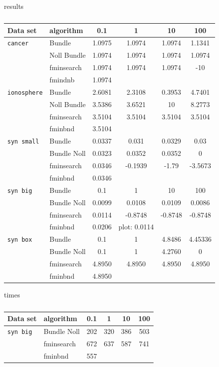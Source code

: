 results

\begin{center}
\begin{table}[H]%
	\begin{tabular}{llcccc}
		\hline
    Data set & algorithm & 0.1 & 1 & 10 & 100 \\
		\hline
		\texttt{cancer} & Bundle & 1.0975 & 1.0974 & 1.0974 & 1.1341 \\
		 & Noll Bundle & 1.0974 & 1.0974 & 1.0974 & 1.0974 \\
		 &  fminsearch & 1.0974 & 1.0974 & 1.0974 & -10 \\
		 & fmindnb & 1.0974 \\
		\texttt{ionosphere} & Bundle & 2.6081 & 2.3108 & 0.3953 & 4.7401 \\
		 & Noll Bundle & 3.5386 & 3.6521 & 10 & 8.2773 \\
		 & fminsearch & 3.5104 & 3.5104 & 3.5104 & 3.5104 \\
		 & fminbnd & 3.5104 \\
		\texttt{syn small} & Bundle & 0.0337 & 0.031 & 0.0329& 0.03 \\
		 & Bundle Noll & 0.0323 & 0.0352 & 0.0352 & 0 \\
		 & fminsearch & 0.0346 & -0.1939 & -1.79 & -3.5673 \\
		 & fminbnd & 0.0346 \\
		\texttt{syn big} & Bundle & 0.1 & 1 & 10 & 100 \\
		 & Bundle Noll & 0.0099 & 0.0108 & 0.0109 & 0.0086 \\
		 & fminsearch & 0.0114 & -0.8748 & -0.8748 & -0.8748 \\
		 & fminbnd & 0.0206 & plot: 0.0114\\
		\texttt{syn box} & Bundle & 0.1 & 1 & 4.8486 & 4.45336 \\
		 & Bundle Noll & 0.1 & 1 & 4.2760 & 0 \\
		 & fminsearch & 4.8950 & 4.8950 & 4.8950 & 4.8950 \\
		 & fminbnd & 4.8950 \\
	\end{tabular}
	\caption{}
\end{table}
\end{center}

times

\begin{center}
\begin{table}[H]%
	\begin{tabular}{llcccc}
		\hline
    Data set & algorithm & 0.1 & 1 & 10 & 100 \\
		\hline
		\texttt{syn big} & Bundle Noll & 202 & 320 & 386 & 503 \\
		 & fminsearch & 672 & 637 & 587 & 741 \\
		 & fminbnd & 557
	\end{tabular}
	\caption{}
\end{table}
\end{center}

